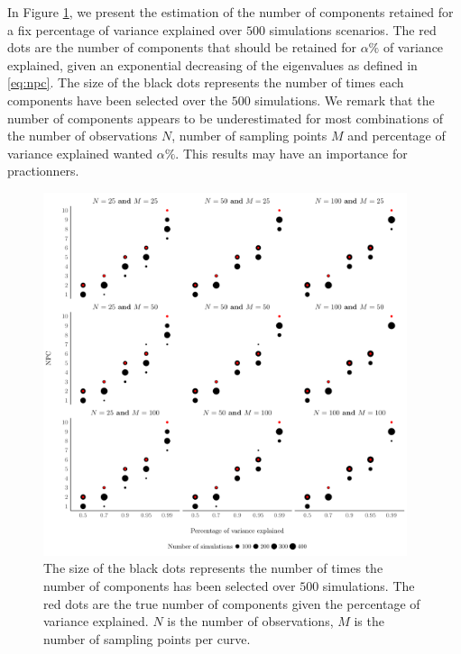 In Figure \ref{fig:npc_estim}, we present the estimation of the number of components retained for a fix percentage of variance explained over $500$ simulations scenarios. The red dots are the number of components that should be retained for $\alpha\%$ of variance explained, given an exponential decreasing of the eigenvalues as defined in \eqref{eq:npc}. The size of the black dots represents the number of times each components have been selected over the $500$ simulations. We remark that the number of components appears to be underestimated for most combinations of the number of observations $N$, number of sampling points $M$ and percentage of variance explained wanted $\alpha\%$. This results may have an importance for practionners.
\begin{figure}
     \centering
    \includegraphics[width=0.95\textwidth]{figures/npc_estim.pdf}
    \caption{The size of the black dots represents the number of times the number of components has been selected over $500$ simulations. The red dots are the true number of components given the percentage of variance explained. $N$ is the number of observations, $M$ is the number of sampling points per curve.}
    \label{fig:npc_estim}
\end{figure}

